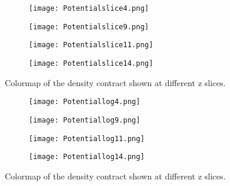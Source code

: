 \begin{figure}[ht!]
\begin{center}
        \begin{subfigure}{.49\textwidth}
      \centering
      \texttt{[image: Potentialslice4.png]}
    \end{subfigure}
%
    \begin{subfigure}{.49\textwidth}
      \centering
      \texttt{[image: Potentialslice9.png]}
    \end{subfigure}
    \begin{subfigure}{.49\textwidth}
      \centering
      \texttt{[image: Potentialslice11.png]}
    \end{subfigure}
    \begin{subfigure}{.49\textwidth}
      \centering
      \texttt{[image: Potentialslice14.png]}
    \end{subfigure}
    \caption{Colormap of the density contract shown at different z slices.}
    \label{fig:Potentialslice}
\end{center}
\end{figure}

\begin{figure}[ht!]
\begin{center}
        \begin{subfigure}{.49\textwidth}
      \centering
      \texttt{[image: Potentiallog4.png]}
    \end{subfigure}
    \begin{subfigure}{.49\textwidth}
      \centering
      \texttt{[image: Potentiallog9.png]}
    \end{subfigure}
    \begin{subfigure}{.49\textwidth}
      \centering
      \texttt{[image: Potentiallog11.png]}
    \end{subfigure}
    \begin{subfigure}{.49\textwidth}
      \centering
      \texttt{[image: Potentiallog14.png]}
    \end{subfigure}
    \caption{Colormap of the density contract shown at different z slices.}
    \label{fig:Potentiallogslice}
\end{center}
\end{figure}











